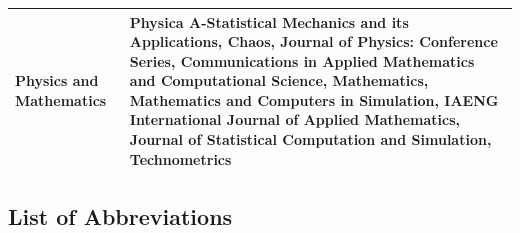 \begin{table}[H]
\begin{adjustbox}{width=1\textwidth,center}
\begin{tabular}{p{} p{}}
        \addlinespace
        \hdashline[0.2pt/3pt]
        \addlinespace
        Physics and Mathematics & Physica A-Statistical Mechanics and its Applications, Chaos, Journal of Physics: Conference Series, Communications in Applied Mathematics and Computational Science, Mathematics, Mathematics and Computers in Simulation, IAENG International Journal of Applied Mathematics, Journal of Statistical Computation and Simulation, Technometrics \\
        \bottomrule
    \end{tabular}
    \end{adjustbox}
\end{table}


\subsection{List of Abbreviations}
\label{appendix:list_of_abbrevations}
    

